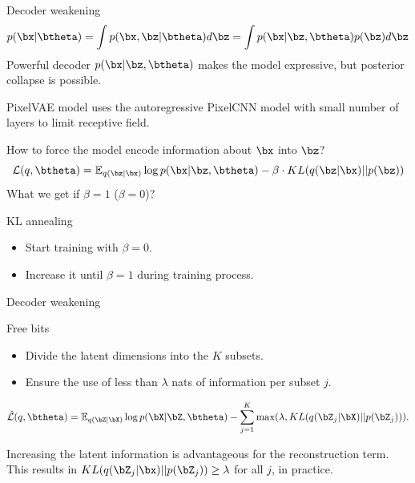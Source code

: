 \begin{frame}{Decoder weakening}
	\[
		p(\bx | \btheta) = \int p(\bx, \bz | \btheta) d \bz = \int p(\bx | \bz, \btheta) p(\bz) d \bz 
	\]
	Powerful decoder $p(\bx | \bz, \btheta)$ makes the model expressive, but posterior collapse is possible.
	
	PixelVAE model uses the autoregressive PixelCNN model with small number of layers to limit receptive field.
	
	How to force the model encode information about $\bx$ into $\bz$?
	\[
	    \mathcal{L}(q, \btheta) = \mathbb{E}_{q(\bz | \bx)} \log p(\bx | \bz, \btheta) - \beta \cdot KL (q(\bz | \bx) || p(\bz))
	\]
	What we get if $\beta = 1$ ($\beta = 0$)? \\
	
	\begin{block}{KL annealing}
		\begin{itemize}
		    \item Start training with $\beta = 0$.
		    \item Increase it until $\beta = 1$ during training process.
		\end{itemize}
	\end{block}
\end{frame}
\begin{frame}{Decoder weakening}
	\begin{block}{Free bits}
	\begin{itemize}
	\item Divide the latent dimensions into the $K$ subsets.
	\item Ensure the use of less than $\lambda$ nats of information per subset $j$.
	\end{itemize}
	
	\[
	    \hat{\mathcal{L}}(q, \btheta) = \mathbb{E}_{q(\bZ | \bX)} \log p(\bX | \bZ, \btheta) - \sum_{j=1}^K \max(\lambda, KL (q(\bZ_j | \bX) || p(\bZ_j))).
	\]
	
	Increasing the latent information is advantageous for the reconstruction term. \\
	\vspace{0.2cm}
	This results in $KL (q(\bZ_j | \bx) || p(\bZ_j)) \geq \lambda$ for all $j$, in practice.
	\end{block}
\end{frame}
